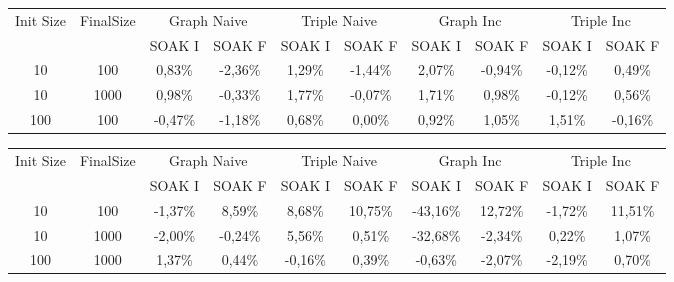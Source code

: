 \begin{sidewaystable}
	\centering
	\scriptsize
	\begin{tabular}{c|c|cc|cc|cc|cc} %
	  	\hline
		Init Size&FinalSize &\multicolumn{2}{c}{Graph Naive}  &\multicolumn{2}{c}{Triple Naive}&\multicolumn{2}{c}{Graph Inc}  &\multicolumn{2}{c}{Triple Inc}\\\
		&& SOAK I & SOAK F& SOAK I & SOAK F& SOAK I & SOAK F& SOAK I & SOAK F\\
		\hline
		\hline
		10&100&0,83\%&	-2,36\%&	1,29\%&	-1,44\%&	2,07\%&	-0,94\%&	-0,12\%&	0,49\%\\	
		10&1000&0,98\%&	-0,33\%&	1,77\%&	-0,07\%&	1,71\%&	0,98\%&	-0,12\%&	0,56\%\\
	
		100&100&	-0,47\%&	-1,18\%&	0,68\%&	0,00\%&	0,92\%&	1,05\%&	1,51\%&	-0,16\%\\
		\hline %
	\end{tabular}
	\caption[\textsc{Analyser} Investigation Stack - Level 1 - SOAK Test Average Latency Comparison]{Mean Latency Comparison Step Response}
	\label{tab:step_latency_comparisons_mean}	

	
	
	\begin{tabular}{|c|c|cc|cc|cc|cc|} %
	  	\hline
		Init Size&FinalSize &\multicolumn{2}{c}{Graph Naive}  &\multicolumn{2}{c}{Triple Naive}&\multicolumn{2}{c}{Graph Inc}  &\multicolumn{2}{c}{Triple Inc}\\\
		&& SOAK I & SOAK F& SOAK I & SOAK F& SOAK I & SOAK F& SOAK I & SOAK F\\
		\hline
		10&	100	& -1,37\%&	8,59\%&	8,68\%&	10,75\%&	-43,16\%&	12,72\%&	-1,72\%&	11,51\%	\\
		10	&1000	&-2,00\%&	-0,24\%&	5,56\%&	0,51\%&	-32,68\%&	-2,34\%&	0,22\%&	1,07\%	\\
		100	&1000&	1,37\%&	0,44\%&	-0,16\%&	0,39\%&	-0,63\%&	-2,07\%&	-2,19\%&	0,70\%	\\
										
		\hline %
	\end{tabular}
	\caption[\textsc{Analyser} Investigation Stack - Level 1 - SOAK Test Average Latency Comparison]{Mean Memory Comparison Step Response}
	\label{tab:step_memory_comparisons_mean}



\end{sidewaystable}
